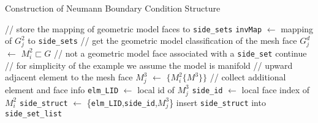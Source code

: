\begin{algorithm}
  \caption{Construction of Neumann Boundary Condition Structure}
  \label{alg:sidesets}
  \begin{algorithmic}[1]
    \State // store the mapping of geometric model faces to \texttt{side\_sets}
    \State \texttt{invMap} $\gets$ mapping of $G^2_j$ to \texttt{side\_sets}
        \State // get the geometric model classification of the mesh face
        \State $G^d_j$ $\gets$ $M^2_i \sqsubset G$
          \State // not a geometric model face associated with a \texttt{side\_set}
          \State continue
        \EndIf
        \State // for simplicity of the example we assume the model is manifold
        \State // upward adjacent element to the mesh face
        \State $M^3_j$ $\gets$ $\{M^2_i\{M^3\}\}$
        \State // collect additional element and face info
        \State \texttt{elm\_LID} $\gets$ local id of $M^3_j$
        \State \texttt{side\_id} $\gets$ local face index of $M^2_i$
        \State \texttt{side\_struct} $\gets$
               \{\texttt{elm\_LID},\texttt{side\_id},$M^3_j$\}
        \State insert \texttt{side\_struct} into \texttt{side\_set\_list}
      \EndFor
  \end{algorithmic}
\end{algorithm}
